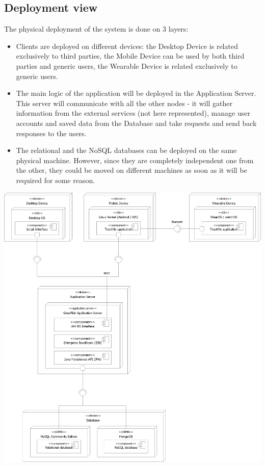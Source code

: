 \subsection{Deployment view}
The physical deployment of the system is done on 3 layers:
\begin{itemize}
\item Clients are deployed on different devices: the Desktop Device is related exclusively to third parties, the Mobile Device can be used by both third parties and generic users, the Wearable Device is related exclusively to generic users.

\item  The main logic of the application will be deployed in the Application Server. This server will communicate with all the other nodes - it will gather information from the external services (not here represented), manage user accounts and saved data from the Database and take requests and send back responses to the users.

\item The relational and the NoSQL databases can be deployed on the same physical machine. However, since they are completely independent one from the other, they could be moved on different machines as soon as it will be required for some reason.
\end{itemize}

\begin{center}
\includegraphics[scale=0.5]{sections/diagrams/deployment.png}
\newline
{}
\end{center}

